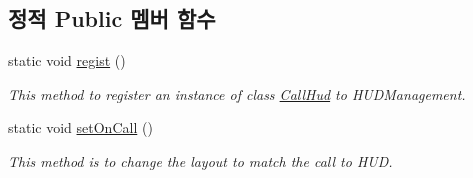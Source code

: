 \subsection*{정적 Public 멤버 함수}
\begin{DoxyCompactItemize}
\item 
static void \hyperlink{classkr_1_1ac_1_1kookmin_1_1cs_1_1call_1_1_call_hud_abc601d5d5e5823dcfe2ec269a1df52d4}{regist} ()
\begin{DoxyCompactList}\small\item\em This method to register an instance of class \hyperlink{classkr_1_1ac_1_1kookmin_1_1cs_1_1call_1_1_call_hud}{Call\+Hud} to H\+U\+D\+Management. \end{DoxyCompactList}\item 
static void \hyperlink{classkr_1_1ac_1_1kookmin_1_1cs_1_1call_1_1_call_hud_aa034521baf8a85af36a375906c693e47}{set\+On\+Call} ()
\begin{DoxyCompactList}\small\item\em This method is to change the layout to match the call to H\+U\+D. \end{DoxyCompactList}\end{DoxyCompactItemize}
